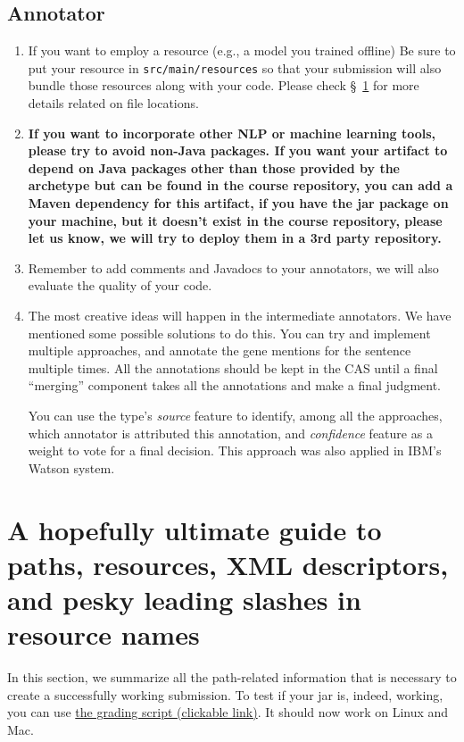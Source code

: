 \subsection{Annotator}

\begin{enumerate}

\item If you want to employ a resource (e.g., a model you trained offline) 
Be sure to put your resource in \texttt{src/main/resources} so that your
submission will also bundle those resources along with your code.
Please check \S~\ref{SectionPathGuide} for more details related
on file locations.


\item \textbf{If you want to incorporate other NLP or machine learning tools,
please try to avoid non-Java packages. If you want your artifact to depend on
Java packages other than those provided by the archetype but can be found
in the course repository, you can add a Maven dependency for this artifact, if
you have the jar package on your machine, but it doesn't exist in the course
repository, please let us know, we will try to deploy them in a 3rd party
repository.}

\item Remember to add comments and Javadocs to your annotators, we will also
evaluate the quality of your code.

\item The most creative ideas will happen in the intermediate annotators. We
have mentioned some possible solutions to do this. You can try and implement
multiple approaches, and annotate the gene mentions for the sentence multiple
times. All the annotations should be kept in the CAS until a final ``merging''
component takes all the annotations and make a final judgment.

You can use the type's \emph{source} feature to identify, among all the
approaches, which annotator is attributed this annotation, and \emph{confidence}
feature as a weight to vote for a final decision. This approach was also applied
in IBM's Watson system.

\end{enumerate}

\section{A hopefully ultimate guide to paths, resources, XML descriptors, and pesky leading slashes
in resource names}
\label{SectionPathGuide}
In this section,
we summarize all the path-related information that is necessary to create a successfully working submission. To test if your jar is, indeed, working, you can use \href{https://github.com/amaiberg/software-engineering-preliminary/blob/master/grading_hw1_2}{the grading script (clickable link)}. 
It should now work on Linux and Mac.

